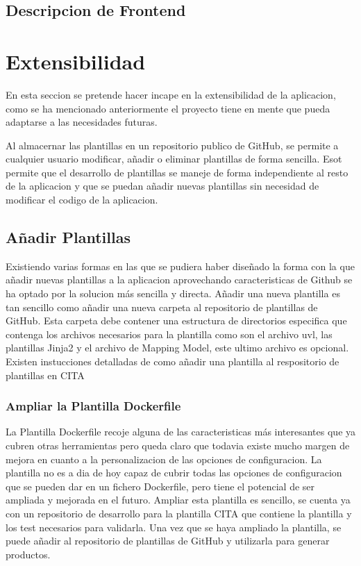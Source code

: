 \documentclass[12pt, a4paper, twoside]{article}
\begin{document}
\subsection{Descripcion de Frontend}



\section{Extensibilidad}
En esta seccion se pretende hacer incape en la extensibilidad de la aplicacion, como se ha mencionado anteriormente el proyecto tiene en mente que pueda adaptarse a las necesidades futuras.

Al almacernar las plantillas en un repositorio publico de GitHub, se permite a cualquier usuario modificar, añadir o eliminar plantillas de forma sencilla.
Esot permite que el desarrollo de plantillas se maneje de forma independiente al resto de la aplicacion y que se puedan añadir nuevas plantillas sin necesidad de modificar el codigo de la aplicacion.
\subsection{Añadir Plantillas}
Existiendo varias formas en las que se pudiera haber diseñado la forma con la que añadir nuevas plantillas a la aplicacion aprovechando caracteristicas de Github se ha optado por la solucion más sencilla y directa.
Añadir una nueva plantilla es tan sencillo como añadir una nueva carpeta al repositorio de plantillas de GitHub.
Esta carpeta debe contener una estructura de directorios especifica que contenga los archivos necesarios para la plantilla como son el archivo uvl, las plantillas Jinja2 y el archivo de Mapping Model, este ultimo archivo es opcional.
Existen instucciones detalladas de como añadir una plantilla al respositorio de plantillas en CITA 

\subsubsection{Ampliar la Plantilla Dockerfile}
La Plantilla Dockerfile recoje alguna de las caracteristicas más interesantes que ya cubren otras herramientas pero queda claro que todavia existe mucho margen de mejora en cuanto a la personalizacion de las opciones de configuracion.
La plantilla no es a dia de hoy capaz de cubrir todas las opciones de configuracion que se pueden dar en un fichero Dockerfile, pero tiene el potencial de ser ampliada y mejorada en el futuro.
Ampliar esta plantilla es sencillo, se cuenta ya con un repositorio de desarrollo para la plantilla CITA que contiene la plantilla y los test necesarios para validarla.
Una vez que se haya ampliado la plantilla, se puede añadir al repositorio de plantillas de GitHub y utilizarla para generar productos.
\end{document}
